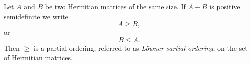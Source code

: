 \documentclass[12pt]{article}
\begin{document}

Let $A$ and $B$ be two Hermitian matrices of the same size. If $A-B$ is positive semidefinite we write \\
\[ A \geq B, \]
or
\[ B \leq A. \]
Then $\geq$ is a partial ordering,
referred to as \emph{L\"owner partial ordering},
on the set of Hermitian matrices.
\end{document}
